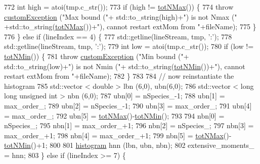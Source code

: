 \begin{DoxyCode}
772             \textcolor{keywordtype}{int} high = atoi(tmp.c\_str());
773             \textcolor{keywordflow}{if} (high != \hyperlink{classsim_system_aee2c65ecb43a35c0c4d070cdb45f7dc0}{totNMax}()) \{
774                 \textcolor{keywordflow}{throw} \hyperlink{classcustom_exception}{customException} (\textcolor{stringliteral}{"Max bound ("}+ std::to\_string(high)+\textcolor{stringliteral}{") is not Nmax ("}
      +std::to\_string(\hyperlink{classsim_system_aee2c65ecb43a35c0c4d070cdb45f7dc0}{totNMax}())+\textcolor{stringliteral}{"), cannot restart extMom from "}+fileName);
775             \}
776         \} \textcolor{keywordflow}{else} \textcolor{keywordflow}{if} (lineIndex == 4) \{
777             std::getline(lineStream, tmp, \textcolor{charliteral}{':'});
778             std::getline(lineStream, tmp, \textcolor{charliteral}{':'});
779             \textcolor{keywordtype}{int} low = atoi(tmp.c\_str());
780             \textcolor{keywordflow}{if} (low != \hyperlink{classsim_system_af10842e0eaa638373b8717c87b47e6bc}{totNMin}()) \{
781                 \textcolor{keywordflow}{throw} \hyperlink{classcustom_exception}{customException} (\textcolor{stringliteral}{"Min bound ("}+ std::to\_string(low)+\textcolor{stringliteral}{") is not Nmin ("}+
      std::to\_string(\hyperlink{classsim_system_af10842e0eaa638373b8717c87b47e6bc}{totNMin}())+\textcolor{stringliteral}{"), cannot restart extMom from "}+fileName);
782             \}
783 
784             \textcolor{comment}{// now reinstantiate the histogram}
785             std::vector < double > lbn (6,0), ubn(6,0);
786             std::vector < long long unsigned int > nbn (6,0);
787             ubn[0] = nSpecies\_-1;
788             ubn[1] = max\_order\_;
789             ubn[2] = nSpecies\_-1;
790             ubn[3] = max\_order\_;
791             ubn[4] = max\_order\_;
792             ubn[5] = \hyperlink{classsim_system_aee2c65ecb43a35c0c4d070cdb45f7dc0}{totNMax}()-\hyperlink{classsim_system_af10842e0eaa638373b8717c87b47e6bc}{totNMin}();
793 
794             nbn[0] = nSpecies\_;
795             nbn[1] = max\_order\_+1;
796             nbn[2] = nSpecies\_;
797             nbn[3] = max\_order\_+1;
798             nbn[4] = max\_order\_+1;
799             nbn[5] = \hyperlink{classsim_system_aee2c65ecb43a35c0c4d070cdb45f7dc0}{totNMax}()-\hyperlink{classsim_system_af10842e0eaa638373b8717c87b47e6bc}{totNMin}()+1;
800 
801             \hyperlink{classhistogram}{histogram} hnn (lbn, ubn, nbn);
802             extensive\_moments\_ = hnn;
803         \} \textcolor{keywordflow}{else} \textcolor{keywordflow}{if} (lineIndex >= 7) \{

\end{DoxyCode}
